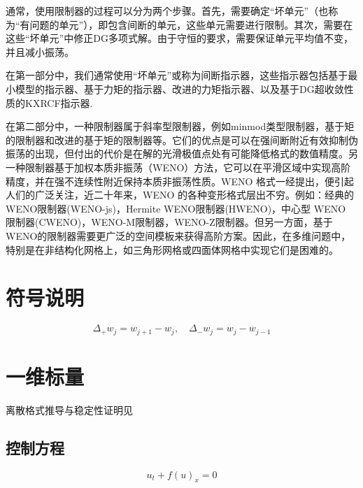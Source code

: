 \documentclass{article}
\numberwithin{equation}{subsection}    %
\begin{document}
通常，使用限制器的过程可以分为两个步骤。首先，需要确定“坏单元”（也称为“有问题的单元”），即包含间断的单元，这些单元需要进行限制。其次，需要在这些“坏单元”中修正DG多项式解。由于守恒的要求，需要保证单元平均值不变，并且减小振荡。

在第一部分中，我们通常使用“坏单元”或称为间断指示器，这些指示器包括基于最小模型的指示器\cite{RKDG2}、基于力矩的指示器\cite{基于力矩的指示器}、改进的力矩指示器\cite{改进的基于矩的限制器}、以及基于DG超收敛性质的KXRCF指示器\cite{基于DG超收敛性质的KXRCF指示器}.

在第二部分中，一种限制器属于斜率型限制器，例如minmod类型限制器\cite{RKDG2,RKDG3,RKDG4,RKDG5}，基于矩的限制器\cite{基于矩的限制器}和改进的基于矩的限制器\cite{改进的基于矩的限制器}等。它们的优点是可以在强间断附近有效抑制伪振荡的出现，但付出的代价是在解的光滑极值点处有可能降低格式的数值精度。另一种限制器基于加权本质非振荡（WENO）方法\cite{WENO1,WENO2,WENO3,WENO4,WENO5}，它可以在平滑区域中实现高阶精度，并在强不连续性附近保持本质非振荡性质。WENO 格式一经提出，便引起人们的广泛关注，近二十年来，WENO 的各种变形格式层出不穷。例如：经典的WENO限制器(WENO-js)\cite{WENO-js1,WENO-js2}，Hermite WENO限制器(HWENO)\cite{HWENO1,HWENO2}，中心型 WENO 限制器(CWENO)\cite{CWENO}，WENO-M限制器\cite{WENO-M}，WENO-Z限制器\cite{WENO-Z}。但另一方面，基于WENO的限制器需要更广泛的空间模板来获得高阶方案。因此，在多维问题中，特别是在非结构化网格上，如三角形网格或四面体网格中实现它们是困难的。

\section{符号说明}
\begin{equation}
    \Delta_{+} w_{j}=w_{j+1}-w_{j}, \quad \Delta_{-} w_{j}=w_{j}-w_{j-1}
\end{equation}

\section{一维标量}
离散格式推导与稳定性证明见\cite{RN16}
\subsection{控制方程}
\begin{equation}
    u_t+f(u)_x = 0
\end{equation}
\end{document}
